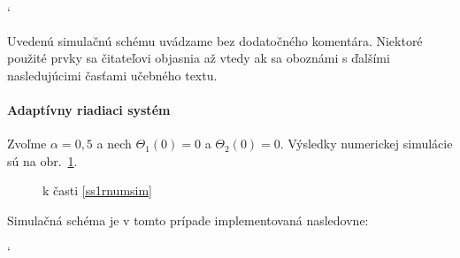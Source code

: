\documentclass[a4paper, 10pt, ]{article}
\begin{document}
{\catcode`

}















\noindent
Uvedenú simulačnú schému uvádzame bez dodatočného komentára. Niektoré použité prvky sa čitateľovi objasnia až vtedy ak sa oboznámi s ďalšími nasledujúcimi časťami učebného textu.



\paragraph{Adaptívny riadiaci systém}
Zvoľme $\alpha = 0,5$ a nech $\Theta_1(0) = 0$ a $\Theta_2(0) = 0$. Výsledky numerickej simulácie sú na obr.~\ref{fig_tex_01_2}.%





\begin{figure}[!t]
	\centering



	\caption{k časti \ref{ss1rnumsim}}
	\label{fig_tex_01_2}

\end{figure}



%
%
%





Simulačná schéma je v tomto prípade implementovaná nasledovne:



{\catcode`

}
\end{document}

